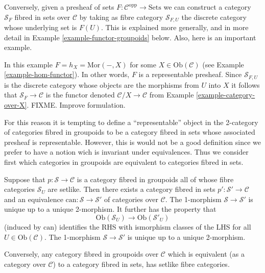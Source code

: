 \medskip\noindent
Conversely, given a presheaf of sets
$F : \mathcal{C}^{\text{opp}} \to \text{Sets}$
we can construct a category $\mathcal{S}_F$ fibred in sets
over $\mathcal{C}$ by taking as fibre category $\mathcal{S}_{F,U}$ 
the discrete category whose underlying set is $F(U)$. This is explained
more generally, and in more detail in Example \ref{example-functor-groupoids}
below. Also, here is an important example.

\begin{example}
\label{example-fibred-category-from-functor-of-points}
In this example $F = h_X = \text{Mor}(-,X)$ for some
$X \in \text{Ob}(\mathcal{C})$ (see Example \ref{example-hom-functor}).
In other words, $F$ is a representable presheaf.
Since $\mathcal{S}_{F,U}$ is the discrete category whose objects are the
morphisms from $U$ into $X$ it follows that
$\mathcal{S}_F\to \mathcal{C}$ is the functor denoted
$\mathcal{C}/X \to \mathcal{C}$ from
Example \ref{example-category-over-X}.
FIXME. Improve formulation.
\end{example}

\noindent
For this reason it is tempting to define a ``representable'' object in the
2-category of categories fibred in groupoids to be a category fibred in
sets whose associated presheaf is representable. However, this is would not
be a good definition since we prefer to have a notion wich is invariant under
equivalences. Thus we consider first which categories in groupoids are
equivalent to categories fibred in sets.

\begin{lemma}
\label{lemma-setlike-fibres}
Suppose that $p : \mathcal{S} \to \mathcal{C}$ is a category fibred in
groupoids all of whose fibre categories $\mathcal{S}_U$ are setlike. 
Then there exists a category fibred in sets $p' : \mathcal{S}' \to
\mathcal{C}$ and an equivalence
$\text{can}:\mathcal{S} \to \mathcal{S}'$ of categories over $\mathcal{C}$.
The 1-morphism $\mathcal{S}\to\mathcal{S}'$ is unique up to a unique
2-morphism. It further has the property that
$$
\text{Ob}(\mathcal{S}_U) \longrightarrow \text{Ob}(\mathcal{S}'_U) 
$$
(induced by $\text{can}$) identifies the RHS with ismorphism classes of the
LHS for all $U \in \text{Ob}(\mathcal{C})$. The 1-morphism
$\mathcal{S}\to\mathcal{S}'$ is unique up to a unique 2-morphism. 

\medskip\noindent
Conversely, any category fibred in groupoids over $\mathcal{C}$ which
is equivalent (as a category over $\mathcal{C}$) to a category fibred 
in sets, has setlike fibre categories.
\end{lemma}

